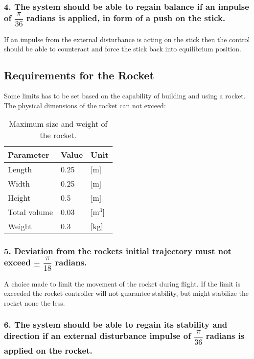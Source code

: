 \subsubsection*{4. The system should be able to regain balance if an impulse of $\dfrac{\pi}{36}$ radians is applied, in form of a push on the stick.} 
\forceindent If an impulse from the external disturbance is acting on the stick then the control should be able to counteract and force the stick back into equilibrium position.   



\subsection{Requirements for the Rocket}
Some limits has to be set based on the capability of building and using a rocket.  
The physical dimensions of the rocket can not exceed:
\begin{table}[htbp]
\centering
\begin{tabular}{lll}
\hline
Parameter    & Value & Unit  \\ \hline
Length       & 0.25  & [m]     \\
Width        & 0.25  & [m]     \\
Height       & 0.5   & [m]     \\
Total volume & 0.03  & [m$^3$] \\
Weight       & 0.3   & [kg]   
\end{tabular}
\caption{Maximum size and weight of the rocket.}
\label{RocketDimensions}
\end{table}


\subsubsection*{5. Deviation from the rockets initial trajectory must not exceed $\pm$ $\dfrac{\pi}{18}$ radians.} 

\forceindent A choice made to limit the movement of the rocket during flight. If the limit is exceeded the rocket controller will not guarantee stability, but might stabilize the rocket none the less.      

\subsubsection*{6. The system should be able to regain its stability and direction if an external disturbance impulse of $\dfrac{\pi}{36}$ radians is applied on the rocket.} 

